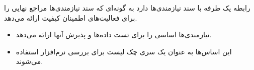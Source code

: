 رابطه یک طرفه با سند نیازمندی‌ها دارد به گونه‌ای که سند نیازمندی‌ها مراجع نهایی
را برای فعالیت‌های اطمینان کیفیت ارائه می‌دهد.

\begin{itemize}
    \item نیازمندی‌ها اساسی را برای تست داده‌ها و پذیرش آنها ارائه می‌دهد.
    \item این اساس‌ها به عنوان یک سری چک لیست برای بررسی نرم‌افزار استفاده
    می‌شوند.
\end{itemize}





